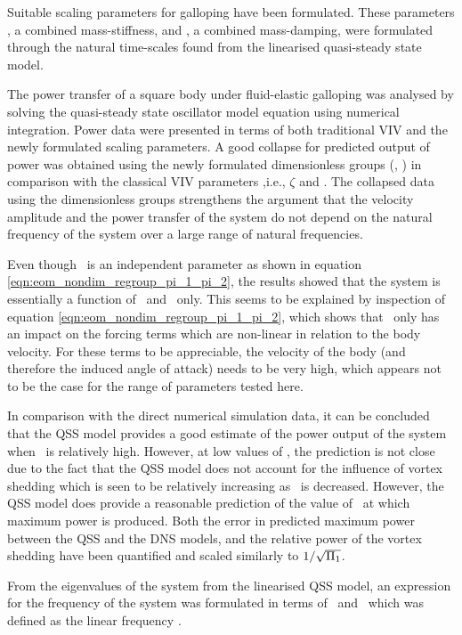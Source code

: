 Suitable scaling parameters for galloping have been formulated. These parameters \massstiff, a combined mass-stiffness, and \massdamp, a combined mass-damping, were formulated through the natural time-scales found from the linearised quasi-steady state model.   

The power transfer of a square body under fluid-elastic galloping was analysed by solving the quasi-steady state oscillator model equation using numerical  integration. Power data were presented in terms of both traditional VIV and the newly formulated scaling parameters. A good collapse for predicted output of power was obtained using the newly formulated  dimensionless groups (\massstiff, \massdamp) in comparison with the classical VIV parameters ,i.e., $\zeta$ and \ustar. The collapsed data using the dimensionless groups strengthens the argument that the velocity amplitude and the power transfer of the system do not depend on the natural frequency of the system over a large range of natural frequencies.

Even though \mstar\ is an independent parameter as shown in equation \ref{eqn:eom_nondim_regroup_pi_1_pi_2}, the results showed that the system is essentially a function of \massstiff\ and \massdamp\ only.  This seems to be explained by inspection of  equation \ref{eqn:eom_nondim_regroup_pi_1_pi_2}, which shows that \mstar\ only has an impact on the forcing terms which are non-linear in relation to the body velocity. For these terms to be appreciable, the velocity of the body (and therefore the induced angle of attack) needs to be very high, which appears not to be the case for the range of parameters tested here. 

In comparison with the direct numerical simulation data, it can be concluded that the QSS model provides a good estimate of the power output of the system when \massstiff\ is relatively high. However, at low values of \massstiff, the prediction is not close due to the fact that the QSS model does not account for the influence of vortex shedding which is seen to be relatively increasing as \massstiff\ is decreased. However, the QSS model does provide a reasonable prediction of the value of \massdamp\ at which maximum power is produced. Both the error in predicted maximum power between the QSS and the DNS models, and the relative power of the vortex shedding have been quantified and scaled similarly to $1/\sqrt{\Pi_1}$.

From the eigenvalues of the system from the linearised QSS model, an expression for the frequency of the system was formulated in terms of \massstiff\ and \massdamp\ which was defined as the linear frequency \freqlin.

